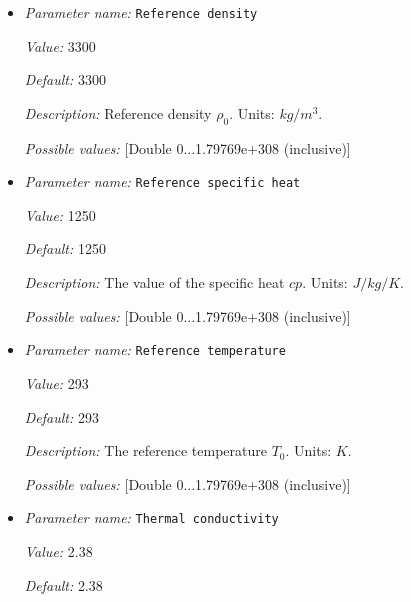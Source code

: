 \begin{itemize}
{\it Value:} 


{\it Default:} 


{\it Description:} A list of widths for each phase transition. The phase functions are scaled with these values, leading to a jump betwen phases for a value of zero and a gradual transition for larger values. List must have the same number of entries as Phase transition depths. Units: $m$.


{\it Possible values:} [List list of <[Double 0...1.79769e+308 (inclusive)]> of length 0...4294967295 (inclusive)]
\item {\it Parameter name:} {\tt Reference density}


{\it Value:} 3300


{\it Default:} 3300


{\it Description:} Reference density $\rho_0$. Units: $kg/m^3$.


{\it Possible values:} [Double 0...1.79769e+308 (inclusive)]
\item {\it Parameter name:} {\tt Reference specific heat}


{\it Value:} 1250


{\it Default:} 1250


{\it Description:} The value of the specific heat $cp$. Units: $J/kg/K$.


{\it Possible values:} [Double 0...1.79769e+308 (inclusive)]
\item {\it Parameter name:} {\tt Reference temperature}


{\it Value:} 293


{\it Default:} 293


{\it Description:} The reference temperature $T_0$. Units: $K$.


{\it Possible values:} [Double 0...1.79769e+308 (inclusive)]
\item {\it Parameter name:} {\tt Thermal conductivity}


{\it Value:} 2.38


{\it Default:} 2.38



\end{itemize}
